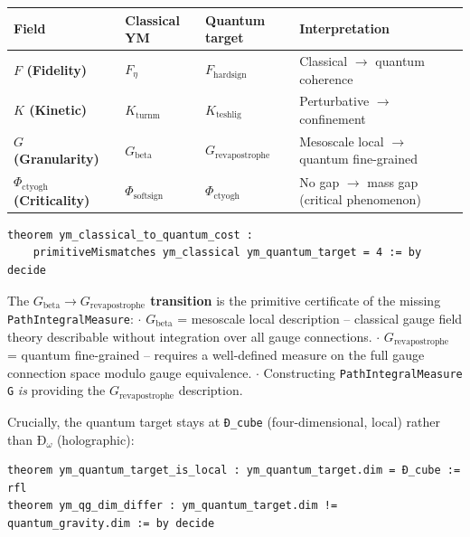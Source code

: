 \documentclass[12pt,a4paper]{article}
\begin{document}
\begin{table}[htbp]
\centering
\small
{}
\begin{tabularx}{\textwidth}{>{\centering\arraybackslash}X >{\centering\arraybackslash}X >{\centering\arraybackslash}X >{\centering\arraybackslash}X}
\toprule
\rowcolor{gray!25}\textbf{Field} & \textbf{Classical YM} & \textbf{Quantum target} & \textbf{Interpretation} \\
\midrule
\rowcolors{1}{white}{gray!10}
\textbf{$F$ (Fidelity)} & $F_{\eta}$ & $F_{\text{hardsign}}$ & Classical $\rightarrow$ quantum coherence \\
\textbf{$K$ (Kinetic)} & $K_{\text{turnm}}$ & $K_{\text{teshlig}}$ & Perturbative $\rightarrow$ confinement \\
\textbf{$G$ (Granularity)} & $G_{\text{beta}}$ & $G_{\text{revapostrophe}}$ & Mesoscale local $\rightarrow$ quantum fine-grained \\
\textbf{$\Phi_{\text{ctyogh}}$ (Criticality)} & $\Phi_{\text{softsign}}$ & $\Phi_{\text{ctyogh}}$ & No gap $\rightarrow$ mass gap (critical phenomenon) \\
\bottomrule
\end{tabularx}
\end{table}

\begin{lstlisting}[language=lean]
theorem ym_classical_to_quantum_cost :
    primitiveMismatches ym_classical ym_quantum_target = 4 := by decide
\end{lstlisting}

The \textbf{$G_{\text{beta}} \to G_{\text{revapostrophe}}$ transition} is the primitive certificate of the missing \texttt{PathIntegralMeasure}:
$\cdot$ $G_{\text{beta}}$ = mesoscale local description  --  classical gauge field theory describable without integration over all gauge connections.
$\cdot$ $G_{\text{revapostrophe}}$ = quantum fine-grained  --  requires a well-defined measure on the full gauge connection space modulo gauge equivalence.
$\cdot$ Constructing \texttt{PathIntegralMeasure G} \emph{is} providing the $G_{\text{revapostrophe}}$ description.

Crucially, the quantum target stays at \texttt{Ð\_cube} (four-dimensional, local) rather than $\text{Ð}_{\omega}$ (holographic):

\begin{lstlisting}[language=lean]
theorem ym_quantum_target_is_local : ym_quantum_target.dim = Ð_cube := rfl
theorem ym_qg_dim_differ : ym_quantum_target.dim != quantum_gravity.dim := by decide
\end{lstlisting}
\end{document}

